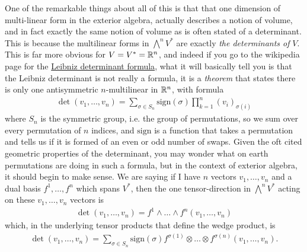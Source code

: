 \documentclass[11pt]{article}
\begin{document}
One of the remarkable things about all of this is that that one dimension of multi-linear form in the exterior algebra, actually describes a notion of volume, and in fact exactly the same notion of volume as is often stated of a determinant. This is because the multilinear forms in $\bigwedge^n V^*$ are exactly \emph{the determinants of} $V$. This is far more obvious for $V = V^* = \mathbb{R}^n$, and indeed if you go to the wikipedia page for the \hyperlink{https://en.wikipedia.org/wiki/Leibniz_formula_for_determinants}{Leibniz determinant formula}, what it will basically tell you is that the Leibniz determinant is not really a formula, it is a \emph{theorem} that states there is only one antisymmetric $n$-multilinear in $\mathbb{R}^n$, with formula \begin{gather*}
\det(v_1, \dots, v_n) = \sum_{\sigma \in S_n} \mathrm{sign}(\sigma) \prod_{k=1}^n (v_i)_{\sigma(i)}
\end{gather*}
where $S_n$ is the symmetric group, i.e. the group of permutations, so we sum over every permutation of $n$ indices, and $\mathrm{sign}$ is a function that takes a permutation and tells us if it is formed of an even or odd number of swaps. Given the oft cited geometric properties of the determinant, you may wonder what on earth permutations are doing in such a formula, but in the context of exterior algebra, it should begin to make sense. We are saying if I have $n$ vectors $v_1, \dots, v_n$ and a dual basis $f^1, \dots, f^n$ which spans $V^*$, then the one tensor-direction in $\bigwedge^n V^*$ acting on these $v_1,\dots, v_n$ vectors is \begin{gather*}
\det(v_1, \dots, v_n) = f^1 \wedge \dots \wedge f^n (v_1, \dots, v_n)  
\end{gather*}
which, in the underlying tensor products that define the wedge product, is 
\begin{gather*}
\det(v_1, \dots, v_n) = \sum_{\sigma \in S_n} \mathrm{sign}(\sigma) f^{\sigma(1)} \otimes \dots \otimes f^{\sigma(n)} (v_1, \dots, v_n).
\end{gather*}
\end{document}
